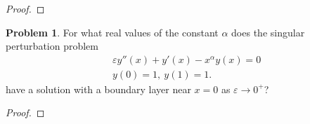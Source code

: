 \documentclass[12pt]{article}
\theoremstyle{definition}
\newtheorem{problem}{Problem}
\begin{document}
\begin{proof}
\end{proof}
\newpage


\begin{problem}
  For what real values of the constant $\alpha$ does the singular perturbation
  problem
  \begin{align*}
    &\varepsilon y''(x) + y'(x) - x^\alpha y(x) = 0  \\
    &y(0) = 1,\ y(1) = 1.
  \end{align*}
  have a solution with a boundary layer near $x=0$ as $\varepsilon \to 0^+$?
\end{problem}

\begin{proof}
\end{proof}
\newpage
\end{document}
